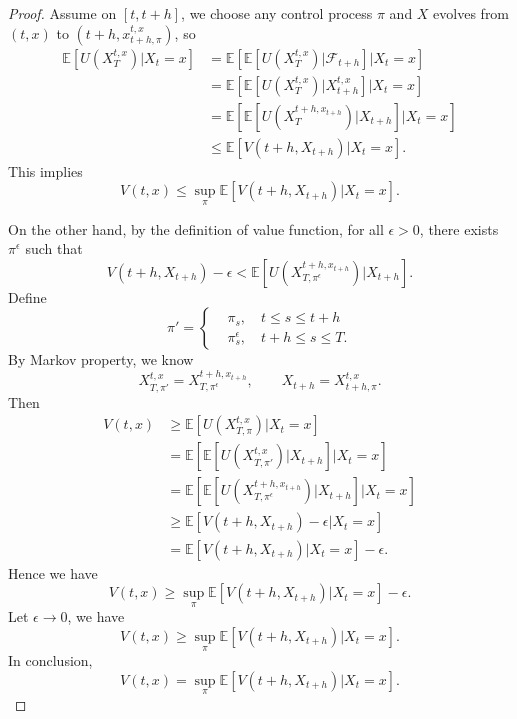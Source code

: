 \documentclass[a4paper]{article}
\theoremstyle{definition}
\numberwithin{equation}{section}
\begin{document}
\begin{proof}
Assume on $[t,t+h]$, we choose any control process $\pi$ and $X$ evolves from $(t,x)$ to $(t+h,x^{t,x}_{t+h,\pi})$, so
\begin{equation}\nonumber
\begin{aligned}
\mathbb E[U(X^{t,x}_T)\lvert X_t=x]&=\mathbb E[\mathbb E[U(X^{t,x}_T)|\mathcal F_{t+h}]\lvert X_t=x]\\
&=\mathbb E[\mathbb E[U(X^{t,x}_T)|X^{t,x}_{t+h}]\lvert X_t=x]\\
&=\mathbb E[\mathbb E[U(X^{t+h,x_{t+h}}_T)|X_{t+h}]\lvert X_t=x]\\
&\leq\mathbb E[V(t+h,X_{t+h})\lvert X_t=x].
\end{aligned}
\end{equation}
This implies
$$V(t,x)\leq\sup_\pi\mathbb E[V(t+h,X_{t+h})\lvert X_t=x].$$

On the other hand, by the definition of value function, for all $\epsilon>0$, there exists $\pi^\epsilon$ such that
$$V(t+h,X_{t+h})-\epsilon<\mathbb E[U(X^{t+h,x_{t+h}}_{T,\pi^\epsilon})\lvert X_{t+h}].$$
Define
\begin{equation}\nonumber
\pi'=\left\{
\begin{aligned}
&\pi_s,\quad t\leq s\leq t+h\\
&\pi^\epsilon_s,\quad t+h \leq s\leq T.
\end{aligned}
\right.
\end{equation}
By Markov property, we know
$$X^{t,x}_{T,\pi'}=X^{t+h,x_{t+h}}_{T,\pi^\epsilon},\qquad X_{t+h}=X^{t,x}_{t+h,\pi}.$$
Then
\begin{equation}\nonumber
\begin{aligned}
V(t,x)&\geq\mathbb E[U(X^{t,x}_{T,\pi})\lvert X_t=x]\\
&=\mathbb E[\mathbb E[U(X^{t,x}_{T,\pi'})|X_{t+h}]\lvert X_t=x]\\
&=\mathbb E[\mathbb E[U(X^{t+h,x_{t+h}}_{T,\pi^\epsilon})|X_{t+h}]\lvert X_t=x]\\
&\geq\mathbb E[V(t+h,X_{t+h})-\epsilon\lvert X_t=x]\\
&=\mathbb E[V(t+h,X_{t+h})\lvert X_t=x]-\epsilon.
\end{aligned}
\end{equation}
Hence we have
$$V(t,x)\geq\sup_\pi\mathbb E[V(t+h,X_{t+h})\lvert X_t=x]-\epsilon.$$
Let $\epsilon\rightarrow0$, we have
$$V(t,x)\geq\sup_\pi\mathbb E[V(t+h,X_{t+h})\lvert X_t=x].$$
In conclusion,
$$V(t,x)=\sup_\pi\mathbb E[V(t+h,X_{t+h})\lvert X_t=x].$$
\end{proof}
\end{document}
